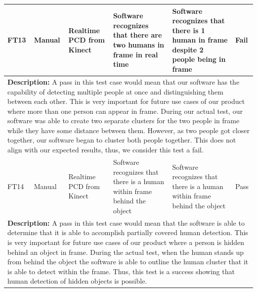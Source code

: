 \documentclass[12pt, titlepage]{article}
\begin{document}
\begin{table}[H]
{\begin{tabular}{|p{1.5cm}|p{2.5cm}|p{3cm}|p{4cm}|p{4cm}|p{1.8cm}|}
      \hline
      FT13 & Manual & \raggedright Realtime PCD from Kinect & \raggedright Software recognizes that there are two humans in frame in real time & \raggedright Software recognizes that there is 1 human in frame despite 2 people being in frame & Fail \\
      \hline
      \multicolumn{6}{|p{\textwidth}|}{\raggedright \textbf{Description:} A pass in this test case would mean that our software has the capability of detecting multiple people at once and distinguishing them between each other. This is very important for future use cases of our product where more than one person can appear in frame. During our actual test, our software was able to create two separate clusters for the two people in frame while they have some distance between them. However, as two people got closer together, our software began to cluster both people together. This does not align with our expected results, thus, we consider this test a fail.} \\
      \hline
      FT14 & Manual & \raggedright Realtime PCD from Kinect & \raggedright Software recognizes that there is a human within frame behind the object & \raggedright Software recognizes that there is a human within frame behind the object & Pass \\
      \hline
      \multicolumn{6}{|p{\textwidth}|}{\raggedright \textbf{Description:} A pass in this test case would mean that the software is able to determine that it is able to accomplish partially covered human detection. This is very important for future use cases of our product where a person is hidden behind an object in frame. During the actual test, when the human stands up from behind the object the software is able to outline the human cluster that it is able to detect within the frame. Thus, this test is a success showing that human detection of hidden objects is possible.} \\
      \hline
  \end{tabular}
  }
\end{table}
\end{document}
